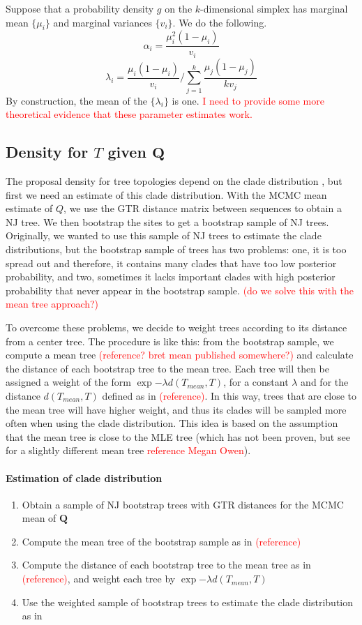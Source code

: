 \documentclass[useAMS,usenatbib]{biom}
\newcommand{\falta}[1]{\textcolor{red}{#1}}
\begin{document}
Suppose that a probability density $g$ on the $k$-dimensional simplex
has marginal mean $\{\mu_i\}$ and marginal variances $\{v_i\}$.  We do
the following.
$$
\alpha_i = \frac{\mu_i^2(1-\mu_i)}{v_i}
$$
$$
\lambda_i = \frac{\mu_i(1-\mu_i)}{v_i} \Bigg/ \sum_{j=1}^k \frac{\mu_j(1-\mu_j)}{kv_j}
$$
By construction, the mean of the $\{\lambda_i\}$ is one.
\falta{I need to provide some more theoretical evidence that these parameter estimates work.}


\subsection{Density for $T$ given $\mathbf{Q}$}
The proposal density for tree topologies depend on the clade
distribution \citep{Larget2013}, but first we need an estimate of this
clade distribution. With the MCMC mean estimate of $Q$, we use the GTR
distance matrix between sequences to obtain a NJ tree. We then
bootstrap the sites to get a bootstrap sample of NJ trees. Originally,
we wanted to use this sample of NJ trees to estimate the clade
distributions, but the bootstrap sample of trees has two problems:
one, it is too spread out and therefore, it contains many clades that
have too low posterior probability, and two, sometimes it lacks
important clades with high posterior probability that never appear in
the bootstrap sample. \falta{(do we solve this with the mean tree
  approach?)}

To overcome these problems, we decide to weight trees according to its
distance from a center tree. The procedure is like this: from the
bootstrap sample, we compute a mean tree \falta{(reference? bret mean
  published somewhere?)} and calculate the distance of each bootstrap
tree to the mean tree. Each tree will then be assigned a weight of the
form $\exp{-\lambda d(T_{mean},T)}$, for a constant $\lambda$ and for
the distance $d(T_{mean},T)$ defined as in \falta{(reference)}. In
this way, trees that are close to the mean tree will have higher
weight, and thus its clades will be sampled more often when using the
clade distribution. This idea is based on the assumption that the mean
tree is close to the MLE tree (which has not been proven, but see for
a slightly different mean tree \falta{reference Megan Owen}).

\paragraph{Estimation of clade distribution}
\begin{enumerate}
\item{Obtain a sample of NJ bootstrap trees with GTR distances for the
    MCMC mean of $\mathbf{Q}$}
\item{Compute the mean tree of the bootstrap sample as in
    \falta{(reference)}}
\item{Compute the distance of each bootstrap tree to the mean tree as
    in \falta{(reference)}, and weight each tree by $\exp{-\lambda
      d(T_{mean},T)}$}
\item{Use the weighted sample of bootstrap trees to estimate the clade
    distribution as in \citep{Larget2013}}
\end{enumerate}
\end{document}
